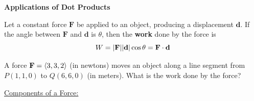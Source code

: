 \documentclass[mathNotesPreamble]{subfiles}
\begin{document}
  \textbf{Applications of Dot Products}

  \begin{defn*}[Work]
    Let a constant force $\mathbf{F}$ be applied to an object, producing a displacement $\mathbf{d}$. If the angle between $\mathbf{F}$ and $\mathbf{d}$ is $\theta$, then the \textbf{work} done by the force is
      \[W={\left\vert\mathbf{F}\right\vert}{\left\vert\mathbf{d}\right\vert}\cos\theta=\mathbf{F}\cdot \mathbf{d}\]
  \end{defn*}

  \begin{ex*}
    A force $\mathbf F={\left\langle 3,3,2 \right\rangle}$ (in newtons) moves an object along a line segment from $P(1,1,0)$ to $Q(6,6,0)$ (in meters). What is the work done by the force? 
  \end{ex*}
  
  \noindent
  \underline{Components of a Force:}
  \vspace*{0.5\baselineskip}
  
\end{document}
